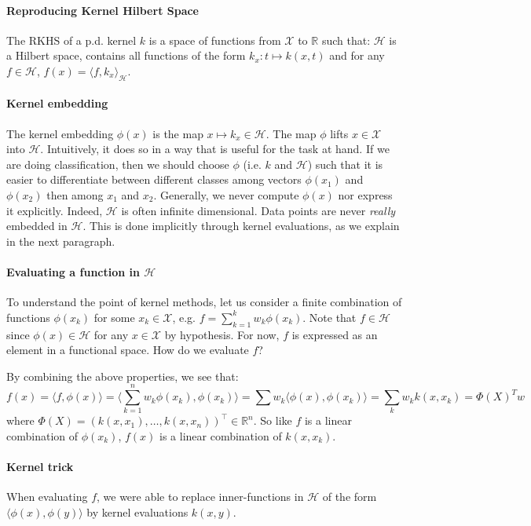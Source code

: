 \paragraph{Reproducing Kernel Hilbert Space}
The RKHS of a p.d. kernel $k$ is a space of functions from $\mathcal X$ to $\mathbb R$ such that: $\mathcal H$ is a Hilbert space, contains all functions of the form $k_x: t\mapsto k(x, t)$ and for any $f\in\mathcal H$, $f(x) = \langle f, k_x\rangle_\mathcal H$.

\paragraph{Kernel embedding}
The kernel embedding $\phi(x)$ is the map $x \mapsto k_x\in\mathcal H$. The map $\phi$ lifts $x\in\mathcal X$ into $\mathcal H$. Intuitively, it does so in a way that is useful for the task at hand. If we are doing classification, then we should choose $\phi$ (i.e. $k$ and $\mathcal H$) such that it is easier to differentiate between different classes among vectors $\phi(x_1)$ and $\phi(x_2)$ then among $x_1$ and $x_2$. Generally, we never compute $\phi(x)$ nor express it explicitly. Indeed, $\mathcal H$ is often infinite dimensional. Data points are never \emph{really} embedded in $\mathcal H$. This is done implicitly through kernel evaluations, as we explain in the next paragraph.

\paragraph{Evaluating a function in $\mathcal H$}
To understand the point of kernel methods, let us consider a finite combination of functions $\phi(x_k)$ for some $x_k\in\mathcal X$, e.g. $f= \sum_{k=1}^k w_k \phi(x_k)$. Note that $f\in\mathcal H$ since $\phi(x)\in\mathcal H$ for any $x\in\mathcal X$ by hypothesis. For now, $f$ is expressed as an element in a functional space. How do we evaluate $f$?

By combining the above properties, we see that:
$$f(x) = \langle f, \phi(x)\rangle = \langle \sum_{k=1}^n w_k\phi(x_k), \phi(x_k)\rangle= \sum w_k \langle \phi(x), \phi(x_k)\rangle = \sum_{k}w_k k(x, x_k)= \Phi(X)^Tw$$
where $\Phi(X) = (k(x, x_1), \ldots, k(x, x_n))^\top\in\mathbb R^n$. So like $f$ is a linear combination of $\phi(x_k)$, $f(x)$ is a linear combination of $k(x, x_k)$.

\paragraph{Kernel trick}
When evaluating $f$, we were able to replace inner-functions in $\mathcal H$ of the form $\langle \phi(x), \phi(y)\rangle$ by kernel evaluations $k(x, y)$.

